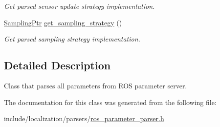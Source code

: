 \begin{DoxyCompactItemize}
\begin{DoxyCompactList}\small\item\em Get parsed sensor update strategy implementation. \end{DoxyCompactList}\item 
\hypertarget{classRosParameterParser_ab29100583b22886d2c4158820253a515}{\hyperlink{sampling_8h_adf4afed667a21b30f8ff816aae609bf7}{Sampling\-Ptr} \hyperlink{classRosParameterParser_ab29100583b22886d2c4158820253a515}{get\-\_\-sampling\-\_\-strategy} ()}\label{classRosParameterParser_ab29100583b22886d2c4158820253a515}

\begin{DoxyCompactList}\small\item\em Get parsed sampling strategy implementation. \end{DoxyCompactList}\end{DoxyCompactItemize}


\subsection{Detailed Description}
Class that parses all parameters from R\-O\-S parameter server. 

The documentation for this class was generated from the following file\-:\begin{DoxyCompactItemize}
\item 
include/localization/parsers/\hyperlink{ros__parameter__parser_8h}{ros\-\_\-parameter\-\_\-parser.\-h}\end{DoxyCompactItemize}
